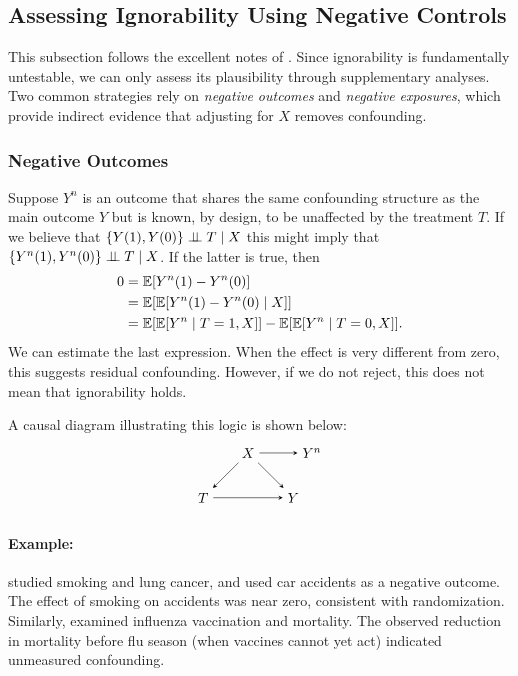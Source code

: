 \documentclass[11pt]{exam}
\begin{document}
\subsection{Assessing Ignorability Using Negative Controls}
This subsection follows the excellent notes of \citet[Sections~16.2.1--16.2.2]{ding2023coursecausalinference}. 
Since ignorability is fundamentally untestable, we can only assess its plausibility through supplementary analyses. Two common strategies rely on \emph{negative outcomes} and \emph{negative exposures}, which provide indirect evidence that adjusting for $X$ removes confounding.

\subsubsection{Negative Outcomes}\label{sec:negative_outcomes}
Suppose $Y^{n}$ is an outcome that shares the same confounding structure as the main outcome $Y$ but is known, by design, to be unaffected by the treatment $T$. If we believe that $\{Y(1), Y(0)\} \perp\!\!\!\perp T \mid X$ this might imply that $ \{Y^n(1), Y^n(0)\} \perp\!\!\!\perp T \mid X$. If the latter is true, then
\begin{align*}
    0 &=\mathbb{E}[Y^n(1) - Y^n(0)] 
    \\
    &=\mathbb{E}[ \mathbb{E}[Y^n(1) - Y^n(0) \mid X]]
    \\
    &= \mathbb{E}[\mathbb{E}[Y^n \mid T = 1, X]] - \mathbb{E}[\mathbb{E}[Y^n \mid T = 0, X]].
\end{align*}
We can estimate the last expression. When the effect is very different from zero, this suggests residual confounding. However, if we do not reject, this does not mean that ignorability holds. 

A causal diagram illustrating this logic is shown below:
\[
\begin{tikzpicture}[>=stealth, node distance=1.6cm]
  \node (X) {$X$};
  \node[right of=X] (Yn) {$Y^n$};
  \node[below right of=X] (Y) {$Y$};
  \node[below left of=X] (T) {$T$};
  \draw[->] (X) -- (T);
  \draw[->] (X) -- (Y);
  \draw[->] (X) -- (Yn);
  \draw[->] (T) -- (Y);
\end{tikzpicture}
\]
\noindent
\paragraph{Example:} \citet{cornfield1959smoking} studied smoking and lung cancer, and used car accidents as a negative outcome. The effect of smoking on accidents was near zero, consistent with randomization.
Similarly, \citet{jackson2006evidence} examined influenza vaccination and mortality. The observed reduction in mortality before flu season (when vaccines cannot yet act) indicated unmeasured confounding.
\end{document}

